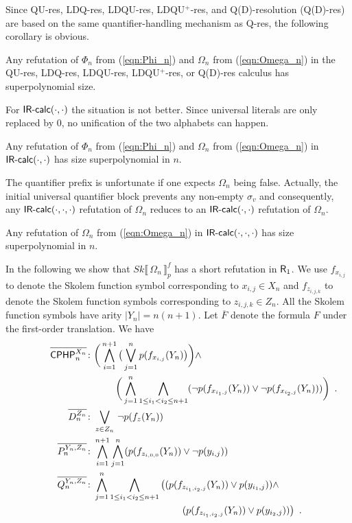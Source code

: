 \documentclass{llncs}
\newcommand{\qres}{\mbox{\sf Q-res}}
\newcommand{\qures}{\mbox{\sf QU-res}}
\newcommand{\qdres}{\mbox{\sf Q(D)-res}}
\newcommand{\ldqres}{\mbox{\sf LDQ-res}}
\newcommand{\ldqures}{\mbox{\sf LDQU-res}}
\newcommand{\ldqupres}{\mbox{\sf LDQU{}$^+$-res}}
\newcommand{\Rfo}{$\mbox{\sf R}_1$}
\newcommand{\IRcalcPM}[2]{$\mbox{\sf IR-calc}(#1,#2)$}
\newcommand{\IRcalcPMSubst}[3]{$\mbox{\sf IR-calc}(#1,#2,#3)$}
\newcommand{\SkQBFtoPL}[3]{\mathit{Sk}\llbracket\,#1\,\rrbracket_{#2}^{#3}}
\newcommand{\PHPText}{CPHP}
\newcommand{\PHPVar}[2]{\mbox{$\mathsf{\PHPText}_{#1}^{#2}$}}
\begin{document}
Since \qures, \ldqres, \ldqures, \ldqupres, and Q(D)-resolution
(\qdres) \cite{SlivovskySzeider-SAT14} are based on the same
quantifier-handling mechanism as \qres, the following corollary is
obvious.

\begin{corollary}
Any refutation of $\Phi_n$ from (\ref{eqn:Phi_n}) and $\Omega_n$ from
(\ref{eqn:Omega_n}) in the \qures, \ldqres, \ldqures, \ldqupres, or
\qdres{} calculus has superpolynomial size. 
\end{corollary}
For \IRcalcPM{\cdot}{\cdot} the situation is not better. Since
universal literals are only replaced by $0$, no unification of the two
alphabets can happen.

\begin{proposition}
Any refutation of $\Phi_n$ from (\ref{eqn:Phi_n}) and $\Omega_n$ from
(\ref{eqn:Omega_n}) in \IRcalcPM{\cdot}{\cdot} has size superpolynomial in $n$.
\end{proposition}
The quantifier prefix is unfortunate if one expects $\Omega_n$ being
false. Actually, the initial universal quantifier block prevents any
non-empty $\sigma_v$ and consequently, any
\IRcalcPMSubst{\cdot}{\cdot}{\cdot} refutation of $\Omega_n$ reduces
to an \IRcalcPM{\cdot}{\cdot} refutation of $\Omega_n$.

\begin{proposition}
Any refutation of $\Omega_n$ from (\ref{eqn:Omega_n}) in
\IRcalcPMSubst{\cdot}{\cdot}{\cdot} has size superpolynomial in $n$.
\end{proposition}
In the following we show that 
$\SkQBFtoPL{\Omega_n}{p}{f}$ has a short refutation in \Rfo. We use
$f_{x_{i,j}}$ to denote the Skolem function symbol corresponding to
$x_{i,j} \in X_n$ and $f_{z_{i,j,k}}$ to denote the Skolem function
symbols corresponding to $z_{i,j,k}\in Z_n$. All the Skolem function
symbols have arity $|Y_n| = n(n+1)$.  Let $\overline{F}$ denote the
formula $F$ under the first-order translation.  We have
\begin{align*}
\overline{\PHPVar{n}{X_n}} &\colon 
  \bigg(\bigwedge_{i=1}^{n+1} \big(\bigvee_{j=1}^{n} 
  p(f_{x_{i,j}}(Y_n) \big)  \bigg)  \land \\
&  \qquad\quad
  \bigg(\bigwedge_{j=1}^{n} \bigwedge_{1\leq i_1<i_2\leq n+1} 
  (\neg p(f_{x_{i_1,j}}(Y_n)) \lor \neg p(f_{x_{i_2,j}}(Y_n)))\bigg)\enspace .
\\
\overline{D_n^{Z_n}} 
& \colon 
\bigvee_{z\in Z_n} \, \neg p(f_z(Y_n))
\\
\qquad\qquad 
\overline{P_n^{Y_n,Z_n}}
& \colon 
\bigwedge_{i=1}^{n+1} \bigwedge_{j=1}^{n} (p(f_{z_{i,0,0}}(Y_n)) \lor 
\neg p(y_{i,j}))
\\
\overline{Q_n^{Y_n,Z_n}}
& \colon 
\bigwedge_{j=1}^{n} \bigwedge_{1\leq i_1<i_2\leq n+1} 
\big((p(f_{z_{i_1,i_2,j}}(Y_n)) \lor p(y_{i_1,j})) \land \\
& \hspace*{10em}
  (p(f_{z_{i_1,i_2,j}}(Y_n)) \lor p(y_{i_2,j}))\big)\enspace .
\end{align*}
\end{document}
